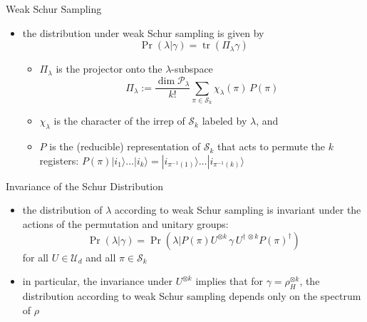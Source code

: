 \documentclass[slideColor]{prosper}
\newcommand{\cP}{{\mathcal{P}}}
\newcommand{\cS}{{\mathcal{S}}}
\newcommand{\cU}{{\mathcal{U}}}
\newcommand{\tr}{\mathop{\mathrm{tr}}}
\renewcommand{\>}{\rangle}
\newcommand{\<}{\langle}
\begin{document}


\begin{slide}{Weak Schur Sampling}
\begin{itemize}
\item the distribution under weak Schur sampling is given by
\[
  \Pr(\lambda|\gamma) =
  \tr(\Pi_\lambda \gamma)
\]
\begin{itemize}
\item $\Pi_\lambda$ is the projector onto the $\lambda$-subspace 
\[
  \Pi_\lambda := \frac{\dim \cP_\lambda}{k!} \sum_{\pi \in \cS_k}
                 \chi_\lambda(\pi) \, P(\pi)
\]
\item $\chi_\lambda$ is the character of the irrep of $\cS_k$ labeled
by $\lambda$, and 
\item $P$ is the (reducible) representation of $\cS_k$ that acts to permute the $k$ registers:
$
  P(\pi)|i_1\> \ldots |i_k\> =
  |i_{\pi^{-1}(1)}\>\ldots 
  |i_{\pi^{-1}(k)}\>
$
\end{itemize}

\end{itemize}
\end{slide}


\begin{slide}{Invariance of the Schur Distribution}
\begin{itemize}
\item the distribution of $\lambda$ according to weak Schur sampling is
invariant under the actions of the permutation and unitary groups:
\[
\Pr(\lambda|\gamma) = 
\Pr(\lambda|P(\pi)U^{\otimes k}\, \gamma\, U^{\dagger \, \otimes k} P(\pi)^\dagger)
\]
for all $U\in\cU_d$ and all $\pi\in\cS_k$
\item in particular, the invariance under $U^{\otimes k}$ implies that for
$\gamma = \rho_H^{\otimes k}$, the distribution according to weak Schur
sampling depends only on the spectrum of $\rho$
\end{itemize}
\end{slide}

\end{document}
